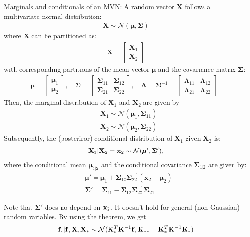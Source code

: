 \begin{theorem} Marginals and conditionals of an MVN:
A random vector $\mathbf{X}$ follows a multivariate normal distribution:
\begin{align*}
	\mathbf{X} \sim \mathcal{N}(\boldsymbol{\mu}, \mathbf{\Sigma})
\end{align*}
where $\mathbf{X}$ can be partitioned as:
\begin{align*}
	\mathbf{X} = \begin{bmatrix}
	\mathbf{X}_1 \\
	\mathbf{X}_2
	\end{bmatrix}
\end{align*}
with corresponding partitions of the mean vector $\boldsymbol{\mu}$ and the covariance matrix \(\mathbf{\Sigma}\):
\begin{align*}
\boldsymbol{\mu} = \begin{bmatrix}
\boldsymbol{\mu}_1 \\
\boldsymbol{\mu}_2
\end{bmatrix}, \quad
\mathbf{\Sigma} = \begin{bmatrix}
\mathbf{\Sigma}_{11} & \mathbf{\Sigma}_{12} \\
\mathbf{\Sigma}_{21} & \mathbf{\Sigma}_{22}
\end{bmatrix},\quad
\mathbf{\Lambda} = \mathbf{\Sigma}^{-1} = \begin{bmatrix}
\mathbf{\Lambda}_{11} & \mathbf{\Lambda}_{12} \\
\mathbf{\Lambda}_{21} & \mathbf{\Lambda}_{22}
\end{bmatrix},
\end{align*}
Then, the marginal distribution of $\mathbf{X}_1$ and $\mathbf{X}_2$ are given by
\begin{align*}
	&\mathbf{X}_1 \sim \mathcal{N}(\boldsymbol{\mu}_1, \mathbf{\Sigma}_{11})\\
	&\mathbf{X}_2 \sim \mathcal{N}(\boldsymbol{\mu}_2, \mathbf{\Sigma}_{22})
\end{align*}
Subsequently, the (posteriror) conditional distribution of $\mathbf{X}_1$ given $\mathbf{X}_2$ is:
\begin{align*}
	\mathbf{X}_1 | \mathbf{X}_2 = {\mathbf{x}}_2\sim \mathcal{N}(\boldsymbol{\mu}', \mathbf{\Sigma}'),
\end{align*}
where the conditional mean \(\boldsymbol{\mu}_{1|2}\) and the conditional covariance \(\mathbf{\Sigma}_{1|2}\) are given by:
\begin{align*}
	&\boldsymbol{\mu}' = \boldsymbol{\mu}_1 + \mathbf{\Sigma}_{12}\mathbf{\Sigma}_{22}^{-1} (\mathbf{x}_2 - \boldsymbol{\mu}_2)\\
	&\mathbf{\Sigma}' = \mathbf{\Sigma}_{11} - \mathbf{\Sigma}_{12}\mathbf{\Sigma}_{22}^{-1}\mathbf{\Sigma}_{21}
\end{align*}
\end{theorem}
Note that $\mathbf{\Sigma}'$ does no depend on ${\mathbf{x}}_2$. It doesn't hold for general (non-Gaussian) random variables.
By using the theorem, we get
$${\mathbf{f}}_*|{\mathbf{f}}, \mathbf{X}, \mathbf{X}_*\sim \mathcal{N}(\mathbf{K}_*^T\mathbf{K}^{-1}{\mathbf{f}}, \mathbf{K}_{**}-\mathbf{K}_*^T\mathbf{K}^{-1}\mathbf{K}_{*})$$

